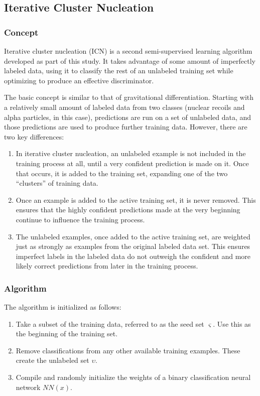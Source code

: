 \documentclass[10pt]{article}
\begin{document}
\subsection{Iterative Cluster Nucleation}

\subsubsection{Concept}

Iterative cluster nucleation (ICN) is a second semi-supervised learning algorithm developed as part of this study. It takes advantage of some amount of imperfectly labeled data, using it to classify the rest of an unlabeled training set while optimizing to produce an effective discriminator.

The basic concept is similar to that of gravitational differentiation. Starting with a relatively small amount of labeled data from two classes (nuclear recoils and alpha particles, in this case), predictions are run on a set of unlabeled data, and those predictions are used to produce further training data. However, there are two key differences:

\begin{enumerate}
    \item In iterative cluster nucleation, an unlabeled example is not included in the training process at all, until a very confident prediction is made on it. Once that occurs, it is added to the training set, expanding one of the two ``clusters'' of training data.
    \item Once an example is added to the active training set, it is never removed. This ensures that the highly confident predictions made at the very beginning continue to influence the training process.
    \item The unlabeled examples, once added to the active training set, are weighted just as strongly as examples from the original labeled data set. This ensures imperfect labels in the labeled data do not outweigh the confident and more likely correct predictions from later in the training process.
\end{enumerate}

\subsubsection{Algorithm}

The algorithm is initialized as follows:

\begin{enumerate}
    \item Take a subset of the training data, referred to as the seed set $\varsigma$. Use this as the beginning of the training set.
    \item Remove classifications from any other available training examples. These create the unlabeled set $\upsilon$.
    \item Compile and randomly initialize the weights of a binary classification neural network $NN(x)$.
\end{enumerate}
\end{document}
